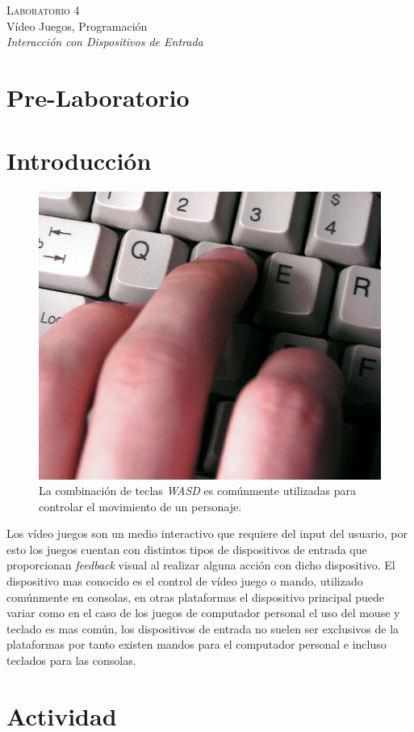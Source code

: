 \begin{center}
\textsc{\Large Laboratorio 4}~\\
{\large Vídeo Juegos, Programación}~\\
\emph{Interacción con Dispositivos de Entrada}
\end{center}

\section{Pre-Laboratorio}

\section{Introducción}
\begin{figure}
\includegraphics[width=\linewidth]{semana4/wasd.jpg}
\caption{La combinación de teclas \emph{WASD} es comúnmente utilizadas para controlar el movimiento de un personaje.}
\label{fig:wasd}
\end{figure}
Los vídeo juegos son un medio interactivo que requiere del input del usuario, por esto los juegos cuentan con distintos tipos de dispositivos de entrada que proporcionan \emph{feedback} visual al realizar alguna acción con dicho dispositivo. El dispositivo mas conocido es el control de vídeo juego o mando, utilizado comúnmente en consolas, en otras plataformas el dispositivo principal puede variar como en el caso de los juegos de computador personal el uso del mouse y teclado es mas común, los dispositivos de entrada no suelen ser exclusivos de la plataformas por tanto existen mandos para el computador personal e incluso teclados para las consolas.

\section{Actividad}
